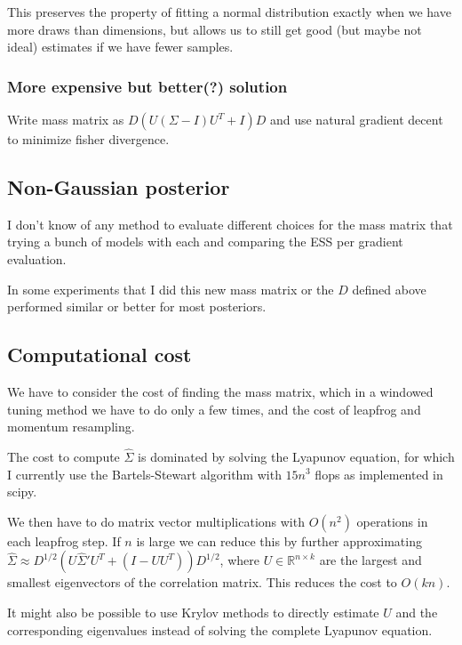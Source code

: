 \documentclass{scrartcl}
\begin{document}
This preserves the property of fitting a normal distribution exactly when we have
more draws than dimensions, but allows us to still get good (but maybe not ideal)
estimates if we have fewer samples.

\subsubsection{More expensive but better(?) solution}

Write mass matrix as $D(U(\Sigma - I)U^T + I)D$ and use natural gradient decent to
minimize fisher divergence.

\subsection{Non-Gaussian posterior}

I don't know of any method to evaluate different choices for the mass matrix
that trying a bunch of models with each and comparing the ESS per gradient
evaluation.

In some experiments that I did this new mass matrix or the $D$ defined above
performed similar or better for most posteriors.

\subsection{Computational cost}

We have to consider the cost of finding the mass matrix, which in a windowed tuning
method we have to do only a few times, and the cost of leapfrog and momentum resampling.

The cost to compute $\hat{\Sigma}$ is dominated by solving the Lyapunov
equation, for which I currently use the Bartels-Stewart algorithm with $15n^3$
flops as implemented in scipy.

We then have to do matrix vector multiplications with $O(n^2)$ operations in
each leapfrog step. If $n$ is large we can reduce this by further approximating
$\hat{\Sigma} \approx D^{1/2}(U\hat{\Sigma}'U^T + (I - UU^T))D^{1/2}$, where $U\in
\mathbb{R}^{n\times k}$ are the largest and smallest eigenvectors of the
correlation matrix. This reduces the cost to $O(kn)$.

It might also be possible to use Krylov methods to directly estimate $U$ and the
corresponding eigenvalues instead of solving the complete Lyapunov equation.

\fi
\end{document}
